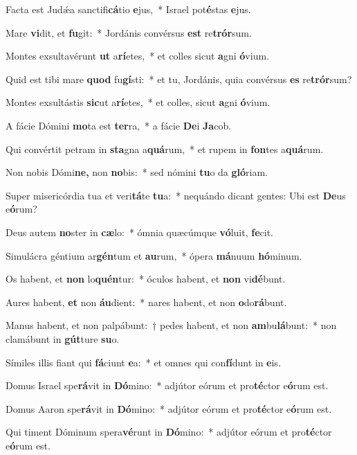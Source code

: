 \item  Facta est Judǽa sanctifi\textbf{cá}tio \textbf{e}jus,~* Israel pot\textbf{é}stas \textbf{e}jus.
\item Mare \textbf{vi}dit, et \textbf{fu}git:~* Jordánis convérsus \textbf{est} re\textbf{trór}sum.
\item Montes exsultavérunt \textbf{ut} a\textbf{rí}etes,~* et colles sicut \textbf{a}gni \textbf{ó}vium.
\item Quid est tibi mare \textbf{quod} fu\textbf{gí}sti:~* et tu, Jordánis, quia convérsus \textbf{es} re\textbf{trór}sum?
\item Montes exsultástis \textbf{sic}ut a\textbf{rí}etes,~* et colles, sicut \textbf{a}gni \textbf{ó}vium.
\item A fácie Dómini \textbf{mo}ta est \textbf{ter}ra,~* a fácie \textbf{De}i \textbf{Ja}cob.
\item Qui convértit petram in \textbf{sta}gna a\textbf{quá}rum,~* et rupem in \textbf{fon}tes a\textbf{quá}rum.
\item Non nobis Dómi\textbf{ne,} non \textbf{no}bis:~* sed nómini \textbf{tu}o da \textbf{gló}riam.
\item Super misericórdia tua et veri\textbf{tá}te \textbf{tu}a:~* nequándo dicant gentes: Ubi est \textbf{De}us e\textbf{ó}rum?
\item Deus autem \textbf{no}ster in \textbf{cæ}lo:~* ómnia quæcúmque \textbf{vó}luit, \textbf{fe}cit.
\item Simulácra géntium ar\textbf{gén}tum et \textbf{au}rum,~* ópera \textbf{má}nuum \textbf{hó}minum.
\item Os habent, et \textbf{non} lo\textbf{quén}tur:~* óculos habent, et \textbf{non} vi\textbf{dé}bunt.
\item Aures habent, \textbf{et} non \textbf{áu}dient:~* nares habent, et non \textbf{o}do\textbf{rá}bunt.
\item Manus habent, et non palpábunt:~† pedes habent, et non \textbf{am}bu\textbf{lá}bunt:~* non clamábunt in \textbf{gút}ture \textbf{su}o.
\item Símiles illis fiant qui \textbf{fá}ciunt \textbf{e}a:~* et o\-mnes qui con\textbf{fí}dunt in \textbf{e}is.
\item Domus Israel spe\textbf{rá}vit in \textbf{Dó}mino:~* adjútor eórum et pro\textbf{té}ctor e\textbf{ó}rum est.
\item Domus Aaron spe\textbf{rá}vit in \textbf{Dó}mino:~* adjútor eórum et pro\textbf{té}ctor e\textbf{ó}rum est.
\item Qui timent Dóminum spera\textbf{vé}runt in \textbf{Dó}mino:~* adjútor eórum et pro\textbf{té}ctor e\textbf{ó}rum est.
